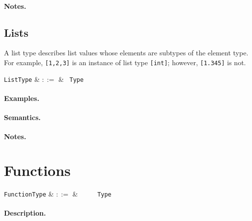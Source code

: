 \paragraph{Notes.} 


\subsection{Lists}

A list type describes list values whose elements are subtypes of the element type. For example, \lstinline{[1,2,3]} is an instance of list type \lstinline{[int]}; however, \lstinline{[1.345]} is not.

\begin{syntax}
  \verb+ListType+ & $::=$ & \token{[} \ \verb+Type+ \ \token{]}\\
\end{syntax}

\paragraph{Examples.}

\paragraph{Semantics.}

\paragraph{Notes.} 


\section{Functions}

\begin{syntax}
  \verb+FunctionType+ & $::=$ & \ \token{(}\
  \ \token{)}\ \token{=>}\ \verb+Type+\\
\end{syntax}

\paragraph{Description.}  

